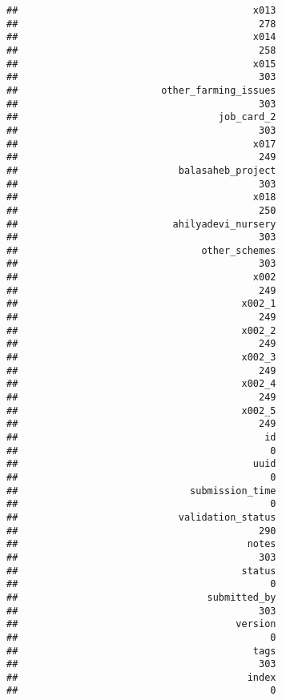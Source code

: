\documentclass[
]{article}
\begin{document}
\begin{verbatim}
##                                         x013 
##                                          278 
##                                         x014 
##                                          258 
##                                         x015 
##                                          303 
##                         other_farming_issues 
##                                          303 
##                                   job_card_2 
##                                          303 
##                                         x017 
##                                          249 
##                            balasaheb_project 
##                                          303 
##                                         x018 
##                                          250 
##                           ahilyadevi_nursery 
##                                          303 
##                                other_schemes 
##                                          303 
##                                         x002 
##                                          249 
##                                       x002_1 
##                                          249 
##                                       x002_2 
##                                          249 
##                                       x002_3 
##                                          249 
##                                       x002_4 
##                                          249 
##                                       x002_5 
##                                          249 
##                                           id 
##                                            0 
##                                         uuid 
##                                            0 
##                              submission_time 
##                                            0 
##                            validation_status 
##                                          290 
##                                        notes 
##                                          303 
##                                       status 
##                                            0 
##                                 submitted_by 
##                                          303 
##                                      version 
##                                            0 
##                                         tags 
##                                          303 
##                                        index 
##                                            0
\end{verbatim}
\end{document}

